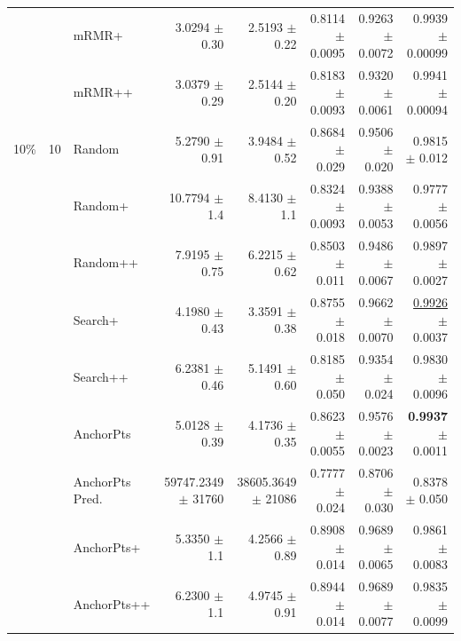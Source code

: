 \begin{longtable}{llp{}rrrrr}
 &  & mRMR+ & 3.0294 {\scriptsize $\pm$ 0.30} & 2.5193 {\scriptsize $\pm$ 0.22} & 0.8114 {\scriptsize $\pm$ 0.0095} & 0.9263 {\scriptsize $\pm$ 0.0072} & 0.9939 {\scriptsize $\pm$ 0.00099} \\
 &  & mRMR++ & 3.0379 {\scriptsize $\pm$ 0.29} & 2.5144 {\scriptsize $\pm$ 0.20} & 0.8183 {\scriptsize $\pm$ 0.0093} & 0.9320 {\scriptsize $\pm$ 0.0061} & 0.9941 {\scriptsize $\pm$ 0.00094} \\
\midrule
10\% & 10 & Random & 5.2790 {\scriptsize $\pm$ 0.91} & 3.9484 {\scriptsize $\pm$ 0.52} & 0.8684 {\scriptsize $\pm$ 0.029} & 0.9506 {\scriptsize $\pm$ 0.020} & 0.9815 {\scriptsize $\pm$ 0.012} \\
 &  & Random+ & 10.7794 {\scriptsize $\pm$ 1.4} & 8.4130 {\scriptsize $\pm$ 1.1} & 0.8324 {\scriptsize $\pm$ 0.0093} & 0.9388 {\scriptsize $\pm$ 0.0053} & 0.9777 {\scriptsize $\pm$ 0.0056} \\
 &  & Random++ & 7.9195 {\scriptsize $\pm$ 0.75} & 6.2215 {\scriptsize $\pm$ 0.62} & 0.8503 {\scriptsize $\pm$ 0.011} & 0.9486 {\scriptsize $\pm$ 0.0067} & 0.9897 {\scriptsize $\pm$ 0.0027} \\
 &  & Search+ & 4.1980 {\scriptsize $\pm$ 0.43} & 3.3591 {\scriptsize $\pm$ 0.38} & 0.8755 {\scriptsize $\pm$ 0.018} & 0.9662 {\scriptsize $\pm$ 0.0070} & \underline{0.9926} {\scriptsize $\pm$ 0.0037} \\
 &  & Search++ & 6.2381 {\scriptsize $\pm$ 0.46} & 5.1491 {\scriptsize $\pm$ 0.60} & 0.8185 {\scriptsize $\pm$ 0.050} & 0.9354 {\scriptsize $\pm$ 0.024} & 0.9830 {\scriptsize $\pm$ 0.0096} \\
 &  & AnchorPts & 5.0128 {\scriptsize $\pm$ 0.39} & 4.1736 {\scriptsize $\pm$ 0.35} & 0.8623 {\scriptsize $\pm$ 0.0055} & 0.9576 {\scriptsize $\pm$ 0.0023} & \textbf{0.9937} {\scriptsize $\pm$ 0.0011} \\
 &  & AnchorPts Pred. & 59747.2349 {\scriptsize $\pm$ 31760} & 38605.3649 {\scriptsize $\pm$ 21086} & 0.7777 {\scriptsize $\pm$ 0.024} & 0.8706 {\scriptsize $\pm$ 0.030} & 0.8378 {\scriptsize $\pm$ 0.050} \\
 &  & AnchorPts+ & 5.3350 {\scriptsize $\pm$ 1.1} & 4.2566 {\scriptsize $\pm$ 0.89} & 0.8908 {\scriptsize $\pm$ 0.014} & 0.9689 {\scriptsize $\pm$ 0.0065} & 0.9861 {\scriptsize $\pm$ 0.0083} \\
 &  & AnchorPts++ & 6.2300 {\scriptsize $\pm$ 1.1} & 4.9745 {\scriptsize $\pm$ 0.91} & 0.8944 {\scriptsize $\pm$ 0.014} & 0.9689 {\scriptsize $\pm$ 0.0077} & 0.9835 {\scriptsize $\pm$ 0.0099} \\

\end{longtable}
